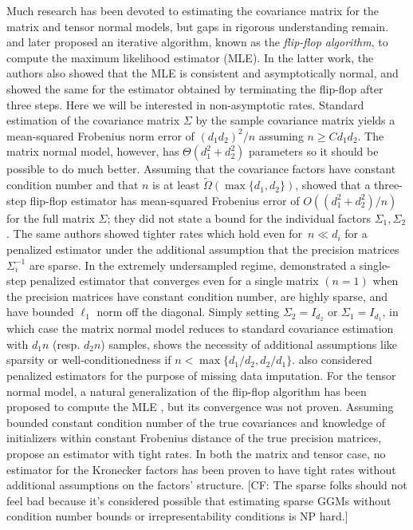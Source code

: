 \documentclass[aos]{imsart}
\theoremstyle{definition}
\numberwithin{equation}{section}
\newcommand{\CF}[1]{{\color{purple}[CF: #1]}}
\begin{document}
Much research has been devoted to estimating the covariance matrix for the matrix and tensor normal models, but gaps in rigorous understanding remain.
\cite{dutilleul1999mle} and later \cite{werner2008estimation} proposed an iterative algorithm, known as the \emph{flip-flop algorithm}, to compute the maximum likelihood estimator (MLE).
In the latter work, the authors also showed that the MLE is consistent and asymptotically normal, and showed the same for the estimator obtained by terminating the flip-flop after three steps.
Here we will be interested in non-asymptotic rates.
Standard estimation of the covariance matrix $\Sigma$ by the sample covariance matrix yields a mean-squared Frobenius norm error of $(d_1 d_2)^2/n$ assuming $n \geq C d_1 d_2$.
The matrix normal model, however, has $\Theta(d_1^2 + d_2^2)$ parameters so it should be possible to do much better.
Assuming that the covariance factors have constant condition number and that $n$ is at least $\tilde{\Omega}(\max\{d_1,d_2\})$, \cite{tsiligkaridis2013convergence} showed that a three-step flip-flop estimator has mean-squared Frobenius error of $O((d_1^2 + d_2^2)/n)$ for the full matrix $\Sigma$; they did not state a bound for the individual factors $\Sigma_1,\Sigma_2$.
The same authors showed tighter rates which hold even for~$n\ll d_i$ for a penalized estimator under the additional assumption that the precision matrices $\Sigma_i^{-1}$ are sparse.
In the extremely undersampled regime, \cite{zhou2014gemini} demonstrated a single-step penalized estimator that converges even for a single matrix $(n=1)$ when the precision matrices have constant condition number, are highly sparse, and have bounded $\ell_1$ norm off the diagonal.
Simply setting $\Sigma_2 = I_{d_2}$ or $\Sigma_1 = I_{d_1}$, in which case the matrix normal model reduces to standard covariance estimation with $d_1 n$ (resp. $d_2 n$) samples, shows the necessity of additional assumptions like sparsity or well-conditionedness if $n < \max\{d_1/d_2, d_2/d_1\}$.
\cite{allen2010transposable} also considered penalized estimators for the purpose of missing data imputation.
For the tensor normal model, a natural generalization of the flip-flop algorithm has been proposed to compute the MLE \citep{mardia1993spatial,manceur2013maximum}, but its convergence was not proven.
Assuming bounded constant condition number of the true covariances and knowledge of initializers within constant Frobenius distance of the true precision matrices, \cite{sun2015nonconvex} propose an estimator with tight rates.
In both the matrix and tensor case, no estimator for the Kronecker factors has been proven to have tight rates without additional assumptions on the factors' structure.
\CF{The sparse folks should not feel bad because it's considered possible that estimating sparse GGMs without condition number bounds or irrepresentability conditions is NP hard.}
\end{document}
